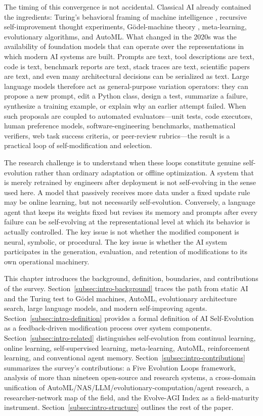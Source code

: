 The timing of this convergence is not accidental. Classical AI already contained the ingredients: Turing's behavioral framing of machine intelligence \cite{turing1950computing}, recursive self-improvement thought experiments, G{\"o}del-machine theory \cite{schmidhuber2003}, meta-learning, evolutionary algorithms, and AutoML. What changed in the 2020s was the availability of foundation models that can operate over the representations in which modern AI systems are built. Prompts are text, tool descriptions are text, code is text, benchmark reports are text, stack traces are text, scientific papers are text, and even many architectural decisions can be serialized as text. Large language models therefore act as general-purpose variation operators: they can propose a new prompt, edit a Python class, design a test, summarize a failure, synthesize a training example, or explain why an earlier attempt failed. When such proposals are coupled to automated evaluators---unit tests, code executors, human preference models, software-engineering benchmarks, mathematical verifiers, web task success criteria, or peer-review rubrics---the result is a practical loop of self-modification and selection.

The research challenge is to understand when these loops constitute genuine self-evolution rather than ordinary adaptation or offline optimization. A system that is merely retrained by engineers after deployment is not self-evolving in the sense used here. A model that passively receives more data under a fixed update rule may be online learning, but not necessarily self-evolution. Conversely, a language agent that keeps its weights fixed but revises its memory and prompts after every failure can be self-evolving at the representational level at which its behavior is actually controlled. The key issue is not whether the modified component is neural, symbolic, or procedural. The key issue is whether the AI system participates in the generation, evaluation, and retention of modifications to its own operational machinery.

This chapter introduces the background, definition, boundaries, and contributions of the survey. Section~\ref{subsec:intro-background} traces the path from static AI and the Turing test to G{\"o}del machines, AutoML, evolutionary architecture search, large language models, and modern self-improving agents. Section~\ref{subsec:intro-definition} provides a formal definition of AI Self-Evolution as a feedback-driven modification process over system components. Section~\ref{subsec:intro-related} distinguishes self-evolution from continual learning, online learning, self-supervised learning, meta-learning, AutoML, reinforcement learning, and conventional agent memory. Section~\ref{subsec:intro-contributions} summarizes the survey's contributions: a Five Evolution Loops framework, analysis of more than nineteen open-source and research systems, a cross-domain unification of AutoML/NAS/LLM/evolutionary-computation/agent research, a researcher-network map of the field, and the Evolve-AGI Index as a field-maturity instrument. Section~\ref{subsec:intro-structure} outlines the rest of the paper.

